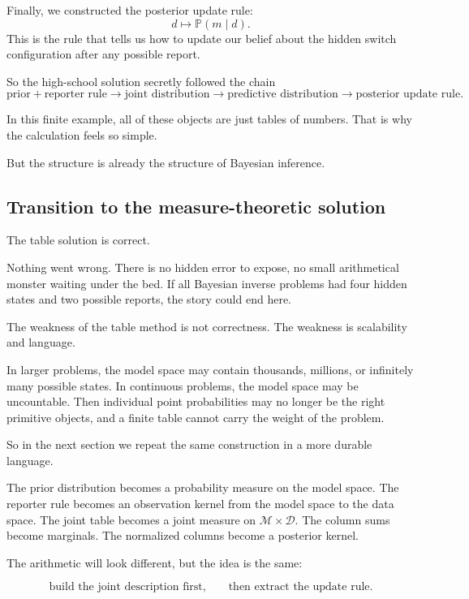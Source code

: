 \documentclass[11pt]{article}
\newcommand{\M}{\mathcal{M}}
\newcommand{\D}{\mathcal{D}}
\begin{document}
Finally, we constructed the posterior update rule:
\[
    d \longmapsto \mathbb{P}(m\mid d).
\]
This is the rule that tells us how to update our belief about the hidden switch configuration after any possible report.

So the high-school solution secretly followed the chain
\[
    \text{prior}
    +
    \text{reporter rule}
    \longrightarrow
    \text{joint distribution}
    \longrightarrow
    \text{predictive distribution}
    \longrightarrow
    \text{posterior update rule}.
\]

In this finite example, all of these objects are just tables of numbers. That is why the calculation feels so simple.

But the structure is already the structure of Bayesian inference.

\subsection{Transition to the measure-theoretic solution}

The table solution is correct.

Nothing went wrong. There is no hidden error to expose, no small arithmetical monster waiting under the bed. If all Bayesian inverse problems had four hidden states and two possible reports, the story could end here.

The weakness of the table method is not correctness. The weakness is scalability and language.

In larger problems, the model space may contain thousands, millions, or infinitely many possible states. In continuous problems, the model space may be uncountable. Then individual point probabilities may no longer be the right primitive objects, and a finite table cannot carry the weight of the problem.

So in the next section we repeat the same construction in a more durable language.

The prior distribution becomes a probability measure on the model space. The reporter rule becomes an observation kernel from the model space to the data space. The joint table becomes a joint measure on \(\M\times\D\). The column sums become marginals. The normalized columns become a posterior kernel.

The arithmetic will look different, but the idea is the same:

\[
    \text{build the joint description first,}
    \qquad
    \text{then extract the update rule.}
\]
\end{document}
